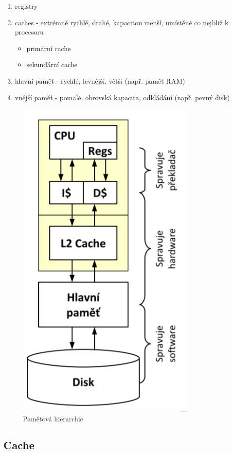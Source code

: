 \documentclass{szzclass}
\providecommand{\tightlist}{%
  \setlength{\itemsep}{0pt}\setlength{\parskip}{0pt}}
\begin{document}
\begin{enumerate}
\def\labelenumi{\arabic{enumi}.}
\tightlist
\item
  registry
\item
  caches - extrémně rychlé, drahé, kapacitou menší, umístěné co nejblíž
  k procesoru

  \begin{itemize}
  \tightlist
  \item
    primární cache
  \item
    sekundární cache
  \end{itemize}
\item
  hlavní paměť - rychlé, levnější, větší (např. paměť RAM)
\item
  vnější paměť - pomalé, obrovská kapacita, odkládání (např. pevný disk)
\end{enumerate}

\begin{figure}
\centering
\includegraphics[width=.5\textwidth]{topics/bi-spol-28/images/mem_hierarchie.png}
\caption{Paměťová hierarchie}
\end{figure}

\hypertarget{cache}{%
\subsection{Cache}\label{cache}}
\end{document}
